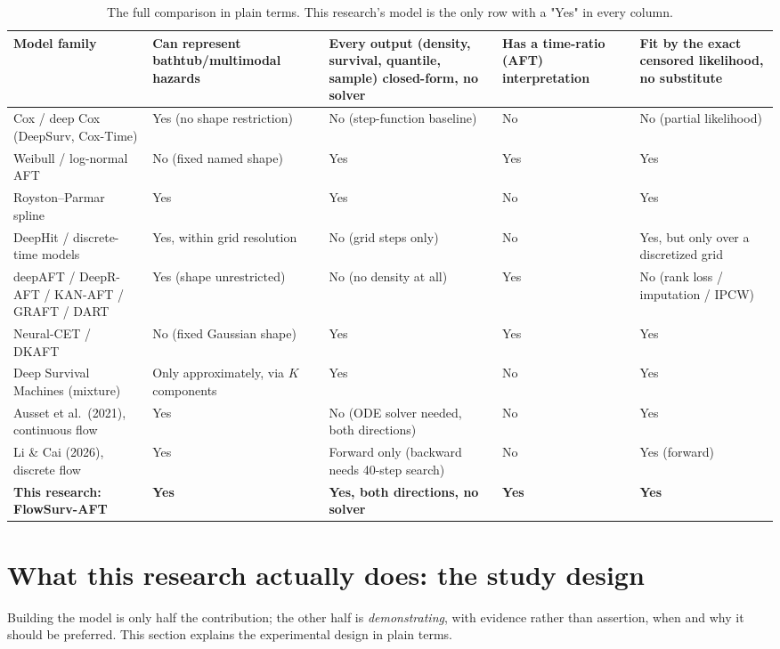 \documentclass[11pt]{article}
\begin{document}
\begin{table}[h!]
\centering
\footnotesize
\setlength{\tabcolsep}{4pt}
\renewcommand{\arraystretch}{1.3}
\begin{tabular}{p{3.3cm}p{2.5cm}p{3.1cm}p{2.3cm}p{2.7cm}}
\toprule
\textbf{Model family} & \textbf{Can represent bathtub/multimodal hazards} & \textbf{Every output (density, survival, quantile, sample) closed-form, no solver} & \textbf{Has a time-ratio (AFT) interpretation} & \textbf{Fit by the exact censored likelihood, no substitute} \\
\midrule
Cox / deep Cox (DeepSurv, Cox-Time) & Yes (no shape restriction) & No (step-function baseline) & No & No (partial likelihood) \\
Weibull / log-normal AFT & No (fixed named shape) & Yes & Yes & Yes \\
Royston--Parmar spline & Yes & Yes & No & Yes \\
DeepHit / discrete-time models & Yes, within grid resolution & No (grid steps only) & No & Yes, but only over a discretized grid \\
deepAFT / DeepR-AFT / KAN-AFT / GRAFT / DART & Yes (shape unrestricted) & No (no density at all) & Yes & No (rank loss / imputation / IPCW) \\
Neural-CET / DKAFT & No (fixed Gaussian shape) & Yes & Yes & Yes \\
Deep Survival Machines (mixture) & Only approximately, via $K$ components & Yes & No & Yes \\
Ausset et al.\ (2021), continuous flow & Yes & No (ODE solver needed, both directions) & No & Yes \\
Li \& Cai (2026), discrete flow & Yes & Forward only (backward needs 40-step search) & No & Yes (forward) \\
\textbf{This research: FlowSurv-AFT} & \textbf{Yes} & \textbf{Yes, both directions, no solver} & \textbf{Yes} & \textbf{Yes} \\
\bottomrule
\end{tabular}
\caption{The full comparison in plain terms. This research's model is the
only row with a "Yes" in every column.}
\label{tab:comparison-plain}
\end{table}

\section{What this research actually does: the study design}
\label{sec:study}

Building the model is only half the contribution; the other half is
\emph{demonstrating}, with evidence rather than assertion, when and why
it should be preferred. This section explains the experimental design in
plain terms.
\end{document}
